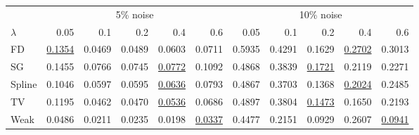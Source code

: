 \begin{tabular}{l|rrrrr|rrrrr}\toprule
 & \multicolumn{5}{c}{5\% noise} & \multicolumn{5}{c}{10\% noise} \\
$\lambda$ & 0.05 & 0.1 & 0.2 & 0.4 & 0.6 & 0.05 & 0.1 & 0.2 & 0.4 & 0.6 \\\midrule
FD & \underline{0.1354} & \colorbox{black!15}{0.0469} & 0.0489 & 0.0603 & 0.0711 & 0.5935 & 0.4291 & 0.1629 & \underline{0.2702} & \colorbox{black!15}{0.3013} \\
SG & 0.1455 & 0.0766 & 0.0745 & \colorbox{black!15}{\underline{0.0772}} & 0.1092 & 0.4868 & 0.3839 & \colorbox{black!15}{\underline{0.1721}} & 0.2119 & 0.2271 \\
Spline & 0.1046 & 0.0597 & 0.0595 & \colorbox{black!15}{\underline{0.0636}} & 0.0793 & 0.4867 & 0.3703 & 0.1368 & \underline{0.2024} & \colorbox{black!15}{0.2485} \\
TV & 0.1195 & 0.0462 & 0.0470 & \colorbox{black!15}{\underline{0.0536}} & 0.0686 & 0.4897 & 0.3804 & \colorbox{black!15}{\underline{0.1473}} & 0.1650 & 0.2193 \\
Weak & 0.0486 & 0.0211 & 0.0235 & 0.0198 & \colorbox{black!15}{\underline{0.0337}} & 0.4477 & 0.2151 & 0.0929 & 0.2607 & \colorbox{black!15}{\underline{0.0941}} \\
\bottomrule\end{tabular}
